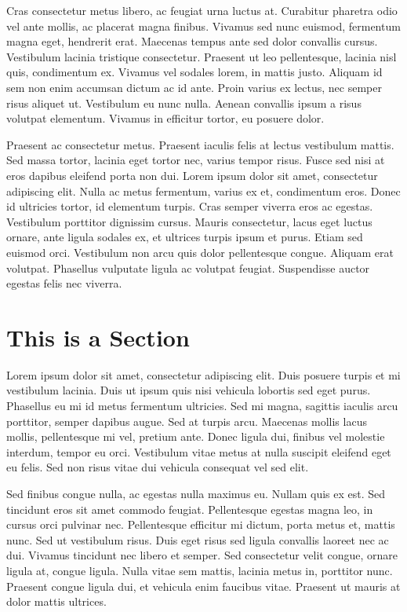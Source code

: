 \documentclass[
  digital,     %
  oneside,     %
  nosansbold,  %
  nocolorbold, %
  lof,         %
  lot,         %
]{fithesis4}
\begin{document}
Cras consectetur metus libero, ac feugiat urna luctus at. Curabitur pharetra odio vel ante mollis, ac placerat magna finibus. Vivamus sed nunc euismod, fermentum magna eget, hendrerit erat. Maecenas tempus ante sed dolor convallis cursus. Vestibulum lacinia tristique consectetur. Praesent ut leo pellentesque, lacinia nisl quis, condimentum ex. Vivamus vel sodales lorem, in mattis justo. Aliquam id sem non enim accumsan dictum ac id ante. Proin varius ex lectus, nec semper risus aliquet ut. Vestibulum eu nunc nulla. Aenean convallis ipsum a risus volutpat elementum. Vivamus in efficitur tortor, eu posuere dolor.

Praesent ac consectetur metus. Praesent iaculis felis at lectus vestibulum mattis. Sed massa tortor, lacinia eget tortor nec, varius tempor risus. Fusce sed nisi at eros dapibus eleifend porta non dui. Lorem ipsum dolor sit amet, consectetur adipiscing elit. Nulla ac metus fermentum, varius ex et, condimentum eros. Donec id ultricies tortor, id elementum turpis. Cras semper viverra eros ac egestas. Vestibulum porttitor dignissim cursus. Mauris consectetur, lacus eget luctus ornare, ante ligula sodales ex, et ultrices turpis ipsum et purus. Etiam sed euismod orci. Vestibulum non arcu quis dolor pellentesque congue. Aliquam erat volutpat. Phasellus vulputate ligula ac volutpat feugiat. Suspendisse auctor egestas felis nec viverra.

\section{This is a Section}
Lorem ipsum dolor sit amet, consectetur adipiscing elit. Duis posuere turpis et mi vestibulum lacinia. Duis ut ipsum quis nisi vehicula lobortis sed eget purus. Phasellus eu mi id metus fermentum ultricies. Sed mi magna, sagittis iaculis arcu porttitor, semper dapibus augue. Sed at turpis arcu. Maecenas mollis lacus mollis, pellentesque mi vel, pretium ante. Donec ligula dui, finibus vel molestie interdum, tempor eu orci. Vestibulum vitae metus at nulla suscipit eleifend eget eu felis. Sed non risus vitae dui vehicula consequat vel sed elit.

Sed finibus congue nulla, ac egestas nulla maximus eu. Nullam quis ex est. Sed tincidunt eros sit amet commodo feugiat. Pellentesque egestas magna leo, in cursus orci pulvinar nec. Pellentesque efficitur mi dictum, porta metus et, mattis nunc. Sed ut vestibulum risus. Duis eget risus sed ligula convallis laoreet nec ac dui. Vivamus tincidunt nec libero et semper. Sed consectetur velit congue, ornare ligula at, congue ligula. Nulla vitae sem mattis, lacinia metus in, porttitor nunc. Praesent congue ligula dui, et vehicula enim faucibus vitae. Praesent ut mauris at dolor mattis ultrices.
\end{document}
